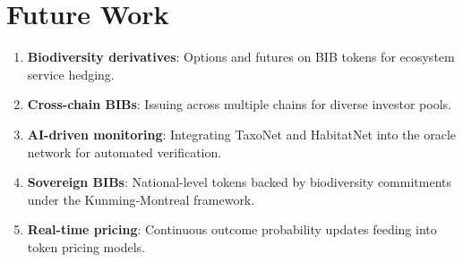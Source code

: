 \section{Future Work}

\label{sec:future}

\begin{enumerate}
  \item \textbf{Biodiversity derivatives}: Options and futures on BIB
    tokens for ecosystem service hedging.
  \item \textbf{Cross-chain BIBs}: Issuing across multiple chains for
    diverse investor pools.
  \item \textbf{AI-driven monitoring}: Integrating TaxoNet and
    HabitatNet into the oracle network for automated verification.
  \item \textbf{Sovereign BIBs}: National-level tokens backed by
    biodiversity commitments under the Kunming-Montreal framework.
  \item \textbf{Real-time pricing}: Continuous outcome probability
    updates feeding into token pricing models.
\end{enumerate}


